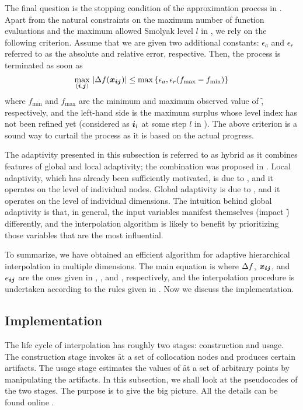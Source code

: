 The final question is the stopping condition of the approximation process in
. Apart from the natural constraints on the maximum number
of function evaluations and the maximum allowed Smolyak level $l$ in
, we rely on the following criterion. Assume that we are
given two additional constants: $\epsilon_a$ and $\epsilon_r$ referred to as the
absolute and relative error, respective. Then, the process is terminated as soon
as
\[
  \max_{(\boldsymbol{i}, \boldsymbol{j})} \, |\Delta f(\boldsymbol{x}_{\boldsymbol{i} \boldsymbol{j}})| \leq \max \left\{ \epsilon_a, \epsilon_r (f_\text{max} - f_\text{min}) \right\}
\]
where $f_\text{min}$ and $f_\text{max}$ are the minimum and maximum observed
value of \f, respectively, and the left-hand side is the maximum surplus whose
level index has not been refined yet (considered as $\boldsymbol{i}_l$ at some step $l$ in
). The above criterion is a sound way to curtail the process
as it is based on the actual progress.

The adaptivity presented in this subsection is referred to as hybrid as it
combines features of global and local adaptivity; the combination was proposed
in \cite{jakeman2012}. Local adaptivity, which has already been sufficiently
motivated, is due to \cite{ma2009}, and it operates on the level of individual
nodes. Global adaptivity is due to \cite{klimke2006}, and it operates on the
level of individual dimensions. The intuition behind global adaptivity is that,
in general, the input variables manifest themselves (impact \f) differently, and
the interpolation algorithm is likely to benefit by prioritizing those variables
that are the most influential.

To summarize, we have obtained an efficient algorithm for adaptive hierarchical
interpolation in multiple dimensions. The main equation is 
where $\Delta f$, $\boldsymbol{x}_{\boldsymbol{i} \boldsymbol{j}}$, and $e_{\boldsymbol{i} \boldsymbol{j}}$ are the ones given in
, , and , respectively, and the
interpolation procedure is undertaken according to the rules given in
. Now we discuss the implementation.

\subsection{Implementation}

The life cycle of interpolation has roughly two stages: construction and usage.
The construction stage invokes \f at a set of collocation nodes and produces
certain artifacts. The usage stage estimates the values of \f at a set of
arbitrary points by manipulating the artifacts. In this subsection, we shall
look at the pseudocodes of the two stages. The purpose is to give the big
picture. All the details can be found online \cite{sources}.

